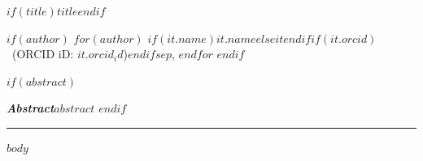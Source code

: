 \documentclass[11pt]{article}
\renewcommand{\footnotesize}{\fontsize{8}{10}\selectfont\lightfont}
\renewenvironment{quote}{%
  \list{}{\leftmargin=1em\rightmargin=1em}\item\relax\itshape\lightfont}{%
  \endlist}
\begin{document}
\thispagestyle{firstpage}

\vspace*{40mm}
{\lightfont\fontsize{14}{18}\selectfont
\setlength{\parindent}{0pt}
$if(title)$$title$$endif$\par}

\bigskip
$if(author)$
{\normalsize
$for(author)$
$if(it.name)$$it.name$$else$$it$$endif$$if(it.orcid)$\ {\footnotesize\color{gray}(ORCID iD: \href{$it.orcid$}{$it.orcid_id$})}$endif$$sep$, $endfor$%
}
$endif$

$if(abstract)$
\bigskip
\begin{quote}
\noindent\textbf{Abstract}\quad $abstract$
\end{quote}
\bigskip
$endif$

\hrule
\bigskip

$body$
\end{document}
